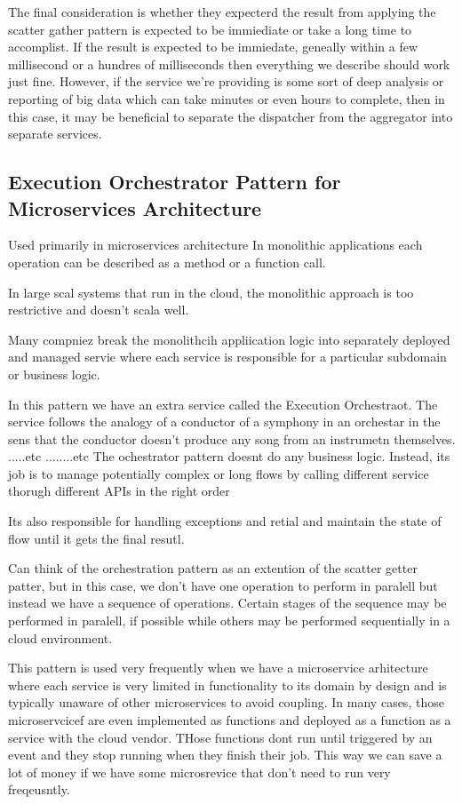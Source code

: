 \documentclass[a4paper, 11pt]{book}
\begin{document}
    The final consideration is whether they expecterd the result from applying the scatter gather pattern is expected to be immiediate or take a long time to accomplist.
    If the result is expected to be immiedate, geneally within a few millisecond or a hundres of milliseconds then everything we describe should work just fine.
    However, if the service we're providing is some sort of deep analysis or reporting of big data which can take minutes or even hours to complete, then in this case, it may be beneficial to separate the dispatcher from the aggregator into separate services.

    \subsection{Execution Orchestrator Pattern for Microservices Architecture}
    Used primarily in microservices architecture
    In monolithic applications each operation can be described as a method or a function call.

    In large scal systems that run in the cloud, the monolithic approach is too restrictive and doesn't scala well.

    Many compniez break the monolithcih appliication logic into separately deployed and managed servie where each service is responsible for a particular subdomain or business logic.

    In this pattern we have an extra service called the Execution Orchestraot.
    The service follows the analogy of a conductor of a symphony in an orchestar in the sens that the conductor doesn't produce any song from an instrumetn themselves.
    .....etc ........etc
    The ochestrator pattern doesnt do any business logic.
    Instead, its job is to manage potentially complex or long flows by calling different service thorugh different APIs in the right order

    Its also responsible for handling exceptions and retial and maintain the state of flow until it gets the final resutl.

    Can think of the orchestration pattern as an extention of the scatter getter patter, but in this case, we don't have one operation to perform in paralell but instead we have a sequence of operations.
    Certain stages of the sequence may be performed in paralell, if possible while others may be performed sequentially in a cloud environment.

    This pattern is used very frequently when we have a microservice arhitecture where each service is very limited in functionality to its domain by design and is typically unaware of other microservices to avoid coupling.
    In many cases, those microservcicef are even implemented as functions and deployed as a function as a service with the cloud vendor.
    THose functions dont run until triggered by an event and they stop running when they finish their job.
    This way we can save a lot of money if we have some microsrevice that don't need to run very freqeusntly.
\end{document}
